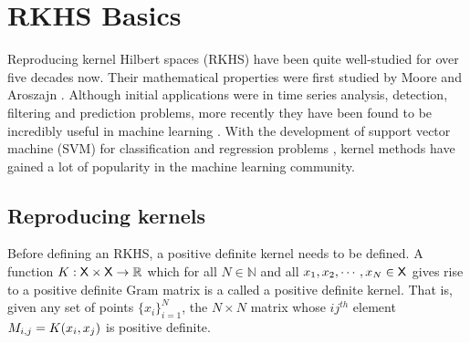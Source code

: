 \section{RKHS Basics}
\label{s:rkhs_basics}
Reproducing kernel Hilbert spaces (RKHS) have been quite well-studied for over five decades now. Their mathematical properties were first studied by Moore \cite{moo1916} and Aroszajn \cite{aro50}. Although initial applications were in time series analysis, detection, filtering and prediction problems, more recently they have been found to be incredibly useful in machine learning \cite{wah90}. With the development of support vector machine (SVM) for classification and regression problems \cite{corvap95, drucburkaufsmovap97}, kernel methods have gained a lot of popularity in the machine learning community. 

\subsection{Reproducing kernels} 
Before defining an RKHS, a positive definite kernel needs to be defined. A function $K : {\sf X} \times {\sf X} \to \mathbb{R}$ which for all $N \in \mathbb{N}$ and all $x_1,x_2,\cdots,x_N \in {\sf X}$ gives rise to a positive definite Gram matrix is a called a positive definite kernel. That is, given any set of points $\{x_i\}_{i=1}^N$, the $N\times N $ matrix whose $ij^{th}$ element $M_{i,j} = K(x_i,x_j)$ is positive definite.  

